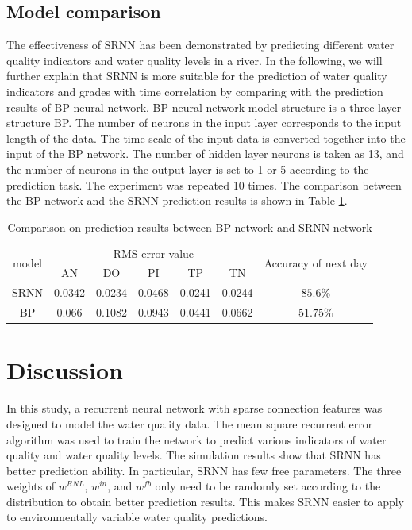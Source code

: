 \documentclass[runningheads]{llncs}
\begin{document}
\subsection{Model comparison}
The effectiveness of SRNN has been demonstrated by predicting 
different water quality indicators and water quality levels in a river. 
In the following, we will further explain that SRNN is more suitable 
for the prediction of water quality indicators and grades with time 
correlation by comparing with the prediction results of BP neural network. 
BP neural network model structure is a three-layer structure BP. The number 
of neurons in the input layer corresponds to the input length of the data. 
The time scale of the input data is converted together into the input of 
the BP network. The number of hidden layer neurons is taken as 13, 
and the number of neurons in the output layer is set to 1 or 5 according 
to the prediction task. The experiment was repeated 10 times. 
The comparison between the BP network and the SRNN prediction results is shown in Table 
\ref{Comparison on prediction results between BP network and SRNN network}.

\begin{table}[htbp] 
\centering
\caption{Comparison on prediction results between BP network and SRNN network}
\label{Comparison on prediction results between BP network and SRNN network}
\begin{tabular}{ccccccc} 
\toprule 
\multirow{2}{*}{model}&\multicolumn{5}{c}{RMS error value}&\multirow{2}{4.25cm}{Accuracy of next day}\\
\cline{2-6}
&AN &DO&PI&TP&TN&\\
\midrule 
SRNN&0.0342&0.0234&0.0468&0.0241&0.0244&$85.6\%$\\
BP&0.066&0.1082&0.0943&0.0441&0.0662&$51.75\%$\\
\bottomrule 
\end{tabular} 
\end{table}

\section{Discussion}
In this study, a recurrent neural network with sparse connection features was 
designed to model the water quality data. The mean square recurrent error algorithm 
was used to train the network to predict various indicators of water quality 
and water quality levels. The simulation results show that SRNN has better 
prediction ability. In particular, SRNN has few free parameters. The three 
weights of $w^{RNL}$, $w^{in}$, and $w^{fb}$ only need to be randomly set 
according to the distribution to obtain better prediction results.
This makes SRNN easier to apply to environmentally variable water 
quality predictions.
\end{document}
